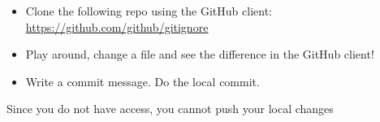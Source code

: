 \documentclass[paper=a4]{scrartcl}
\begin{document}
\begin{itemize}
  \item Clone the following repo using the GitHub client: \href{https://github.com/github/gitignore}{\url{https://github.com/github/gitignore}}
  \item Play around, change a file and see the difference in the GitHub client!
  \item Write a commit message. Do the local commit.
\end{itemize}

\begin{hints}
  \item Since you do not have access, you cannot push your local changes
\end{hints}
\end{document}
